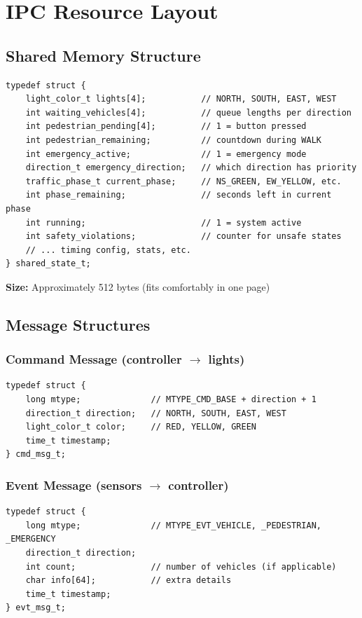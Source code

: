 \documentclass[11pt,a4paper]{article}
\begin{document}
\newpage
\section{IPC Resource Layout}

\subsection{Shared Memory Structure}

\begin{lstlisting}[caption={shared\_state\_t structure (simplified)}]
typedef struct {
    light_color_t lights[4];           // NORTH, SOUTH, EAST, WEST
    int waiting_vehicles[4];           // queue lengths per direction
    int pedestrian_pending[4];         // 1 = button pressed
    int pedestrian_remaining;          // countdown during WALK
    int emergency_active;              // 1 = emergency mode
    direction_t emergency_direction;   // which direction has priority
    traffic_phase_t current_phase;     // NS_GREEN, EW_YELLOW, etc.
    int phase_remaining;               // seconds left in current phase
    int running;                       // 1 = system active
    int safety_violations;             // counter for unsafe states
    // ... timing config, stats, etc.
} shared_state_t;
\end{lstlisting}

\textbf{Size:} Approximately 512 bytes (fits comfortably in one page)

\subsection{Message Structures}

\subsubsection{Command Message (controller $\rightarrow$ lights)}
\begin{lstlisting}
typedef struct {
    long mtype;              // MTYPE_CMD_BASE + direction + 1
    direction_t direction;   // NORTH, SOUTH, EAST, WEST
    light_color_t color;     // RED, YELLOW, GREEN
    time_t timestamp;
} cmd_msg_t;
\end{lstlisting}

\subsubsection{Event Message (sensors $\rightarrow$ controller)}
\begin{lstlisting}
typedef struct {
    long mtype;              // MTYPE_EVT_VEHICLE, _PEDESTRIAN, _EMERGENCY
    direction_t direction;
    int count;               // number of vehicles (if applicable)
    char info[64];           // extra details
    time_t timestamp;
} evt_msg_t;
\end{lstlisting}
\end{document}
